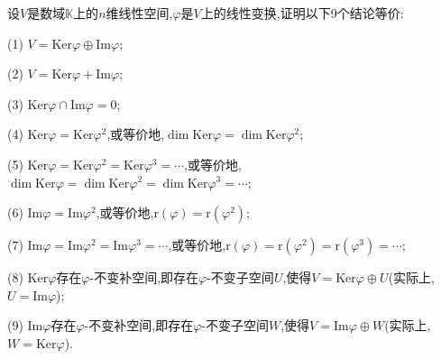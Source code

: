 \documentclass[../../main.tex]{subfiles}
\begin{document}
\begin{proposition}\label{proposition:像空间和核空间的直和分解}
设\(V\)是数域\(\mathbb{K}\)上的\(n\)维线性空间,\(\varphi\)是\(V\)上的线性变换,证明以下9个结论等价:

(1) \(V=\text{Ker}\varphi\oplus\text{Im}\varphi\);

(2) \(V=\text{Ker}\varphi+\text{Im}\varphi\);

(3) \(\text{Ker}\varphi\cap\text{Im}\varphi = 0\);

(4) \(\text{Ker}\varphi=\text{Ker}\varphi^2\),或等价地,\(\dim\text{Ker}\varphi=\dim\text{Ker}\varphi^2\);

(5) \(\text{Ker}\varphi=\text{Ker}\varphi^2=\text{Ker}\varphi^3=\cdots\),或等价地,\(\dim\text{Ker}\varphi=\dim\text{Ker}\varphi^2=\dim\text{Ker}\varphi^3=\cdots\);

(6) \(\text{Im}\varphi=\text{Im}\varphi^2\),或等价地,\(\text{r}(\varphi)=\text{r}(\varphi^2)\);

(7) \(\text{Im}\varphi=\text{Im}\varphi^2=\text{Im}\varphi^3=\cdots\),或等价地,\(\text{r}(\varphi)=\text{r}(\varphi^2)=\text{r}(\varphi^3)=\cdots\);

(8) \(\text{Ker}\varphi\)存在\(\varphi\)-不变补空间,即存在\(\varphi\)-不变子空间\(U\),使得\(V=\text{Ker}\varphi\oplus U\)(实际上,$U = \text{Im}\varphi$);

(9) \(\text{Im}\varphi\)存在\(\varphi\)-不变补空间,即存在\(\varphi\)-不变子空间\(W\),使得\(V=\text{Im}\varphi\oplus W\)(实际上,$W = \text{Ker}\varphi$).
\end{proposition}
\end{document}
